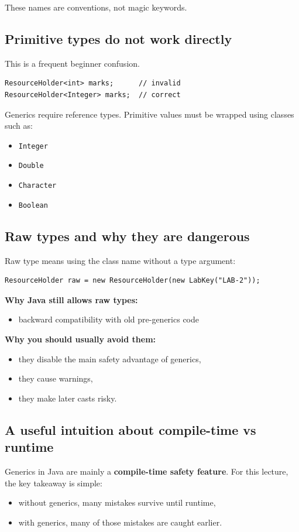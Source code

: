 \documentclass[11pt]{article}
\begin{document}
These names are conventions, not magic keywords.

\subsection{Primitive types do not work directly}
This is a frequent beginner confusion.

\begin{lstlisting}
ResourceHolder<int> marks;      // invalid
ResourceHolder<Integer> marks;  // correct
\end{lstlisting}

Generics require reference types.
Primitive values must be wrapped using classes such as:
\begin{itemize}
  \item \texttt{Integer}
  \item \texttt{Double}
  \item \texttt{Character}
  \item \texttt{Boolean}
\end{itemize}

\subsection{Raw types and why they are dangerous}
Raw type means using the class name without a type argument:
\begin{lstlisting}
ResourceHolder raw = new ResourceHolder(new LabKey("LAB-2"));
\end{lstlisting}

\textbf{Why Java still allows raw types:}
\begin{itemize}
  \item backward compatibility with old pre-generics code
\end{itemize}

\textbf{Why you should usually avoid them:}
\begin{itemize}
  \item they disable the main safety advantage of generics,
  \item they cause warnings,
  \item they make later casts risky.
\end{itemize}

\subsection{A useful intuition about compile-time vs runtime}
Generics in Java are mainly a \textbf{compile-time safety feature}.
For this lecture, the key takeaway is simple:
\begin{itemize}
  \item without generics, many mistakes survive until runtime,
  \item with generics, many of those mistakes are caught earlier.
\end{itemize}
\end{document}

